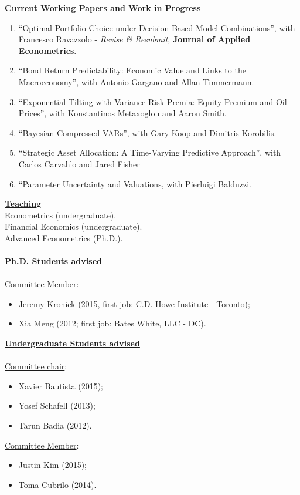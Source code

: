 \documentclass[12pt]{article}
\begin{document}
\underline{\textbf{Current Working Papers and Work in Progress}}
\begin{enumerate}
	\setcounter{enumi}{\theenumTemp}
	\item ``Optimal Portfolio Choice under Decision-Based Model Combinations'', with Francesco Ravazzolo - \textit{Revise \& Resubmit}, \textbf{Journal of Applied Econometrics}.
	\item ``Bond Return Predictability: Economic Value and Links to the Macroeconomy'', with Antonio Gargano and Allan Timmermann.
	\item ``Exponential Tilting with Variance Risk Premia: Equity Premium and Oil Prices'', with Konstantinos Metaxoglou  and Aaron Smith.
	\item ``Bayesian Compressed VARs'', with Gary Koop and Dimitris Korobilis.
	\item ``Strategic Asset Allocation: A Time-Varying Predictive Approach'', with Carlos Carvahlo and Jared Fisher 
	\item ``Parameter Uncertainty and Valuations, with Pierluigi Balduzzi.
	
\end{enumerate}

\underline{\textbf{Teaching}}\\
Econometrics (undergraduate).\\
Financial Economics (undergraduate). \\
Advanced Econometrics (Ph.D.). \\ \\
\underline{\textbf{Ph.D. Students advised}} \\ \\
\underline{Committee Member}: 
\begin{itemize}
	\item Jeremy Kronick (2015, first job: C.D. Howe Institute - Toronto);
	\item Xia Meng (2012; first job: Bates White, LLC - DC). 
\end{itemize}
\underline{\textbf{Undergraduate Students advised}} \\ \\
\underline{Committee chair}: 
\begin{itemize}
	\item Xavier Bautista (2015);
	\item Yosef Schafell (2013);
	\item Tarun Badia (2012). 
\end{itemize}
\underline{Committee Member}: 
\begin{itemize}
	\item Justin Kim (2015);
	\item Toma Cubrilo (2014).
\end{itemize}
\end{document}
